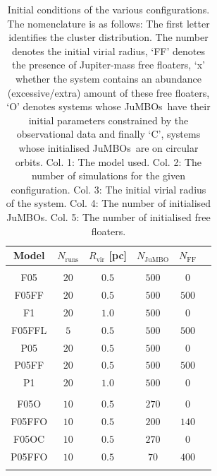 \documentclass[submission,phys]{lib/SciPost}
\newcommand{\jumbo}{\mbox{JuMBO}}
\newcommand{\jumbos}{\mbox{JuMBOs}}
\begin{document}
\begin{table}
       \caption{Initial conditions of the various configurations. The nomenclature is as follows: The first letter identifies the cluster distribution. The number denotes the initial virial radius, `FF' denotes the presence of Jupiter-mass free floaters, `x' whether the system contains an abundance (excessive/extra) amount of these free floaters, `O' denotes systems whose \jumbos\, have their initial parameters constrained by the observational data and finally `C', systems whose initialised \jumbos\, are on circular orbits. Col.  1: The model used. Col.  2: The number of simulations for the given configuration. Col.  3: The initial virial radius of the system. Col.  4: The number of initialised \jumbos. Col.  5: The number of initialised free floaters.}
        \label{Tab:SF_FF_Params}
        \centering 
        \begin{tabular}{c c c c c c}
        \hline\hline
        Model & $N_{\mathrm{runs}}$ & $R_{\mathrm{vir}}$ [pc] & $N_{\mathrm{\jumbo}}$ & $N_{\mathrm{FF}}$\\
        \hline \vspace{-0.75em}\\ 
           F05     & $20$ & $0.5$ & $500$ & $0$   \\
           F05FF   & $20$ & $0.5$ & $500$ & $500$ \\
           F1      & $20$ & $1.0$ & $500$ & $0$   \\
           F05FFL  & $5$  & $0.5$ & $500$ & $500$ \\
           P05     & $20$ & $0.5$ & $500$ & $0$   \\
           P05FF   & $20$ & $0.5$ & $500$ & $500$ \\
           P1      & $20$ & $1.0$ & $500$ & $0$   \\
           \hline \vspace{-0.75em}\\
           F05O    & $10$ & $0.5$ & $270$ & $0$   \\
           F05FFO  & $10$ & $0.5$ & $200$ & $140$ \\
           F05OC   & $10$ & $0.5$ & $270$ & $0$   \\
           P05FFO  & $10$ & $0.5$ & $70$ & $400$  \\
           \hline
         \hline                                   %
         \label{Tab:ISF_FFC_Initial}
        \end{tabular}
     \end{table}
\end{document}
